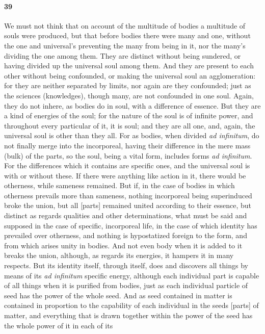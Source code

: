 \documentclass[12pt]{article}
\begin{document}
\paragraph{39} We must not think that on account of the multitude of bodies a
multitude of souls were produced, but that before bodies there were many and
one, without the one and universal's preventing the many from being in it, nor
the many's dividing the one among them. They are distinct without being
sundered, or having divided up the universal soul among them. And they are
present to each other without being confounded, or making the universal soul an
agglomeration: for they are neither separated by limits, nor again are they
confounded; just as the sciences (knowledges), though many, are not confounded
in one soul. Again, they do not inhere, as bodies do in soul, with a difference
of es\-sence. But they are a kind of energies of the soul; for the nature of
the soul is of infinite power, and throughout every particular of it, it is
soul; and they are all one, and, again, the universal soul is other than they
all. For as bodies, when divided \textit{ad infinitum}, do not finally merge
into the incorporeal, having their difference in the mere mass (bulk) of the
parts, so the soul, being a vital form, includes forms \textit{ad infinitum}.
For the differences which it contains are specific ones, and the universal soul
is with or without these. If there were anything like action in it, there would
be otherness, while sameness remained. But if, in the case of bodies in which
otherness prevails more than sameness, nothing incorporeal being superinduced
broke the union, but all [parts] remained united according to their es\-sence,
but distinct as regards qualities and other determinations, what must be said
and supposed in the case of specific, incorporeal life, in the case of which
identity has prevailed over otherness, and nothing is hypostatized foreign to
the form, and from which arises unity in bodies. And not even body when it is
added to it breaks the union, although, as regards its energies, it hampers it
in many respects. But its identity itself, through itself, does and discovers
all things by means of its \textit{ad infinitum} specific energy, although each
individual part is capable of all things when it is purified from bodies, just
as each individual particle of seed has the power of the whole seed. And as
seed contained in matter is contained in proportion to the capability of each
individual in the seeds [parts] of matter, and everything that is drawn
together within the power of the seed has the whole power of it in each of its
\end{document}
